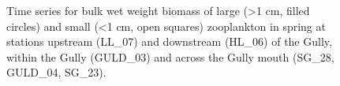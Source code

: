\documentclass[12pt]{article}\usepackage[]{graphicx}\usepackage[]{color}
\begin{document}
\begin{figure}[htb]

{\centering {} 

}

\caption{Time series for bulk wet weight biomass of large (\textgreater1 cm, filled circles) and small (\textless1 cm, open squares) zooplankton in spring at stations upstream (LL\_07) and downstream (HL\_06) of the Gully, within the Gully (GULD\_03) and across the Gully mouth (SG\_28, GULD\_04, SG\_23).}\label{fig:figure29}
\end{figure}
\clearpage
\end{document}
